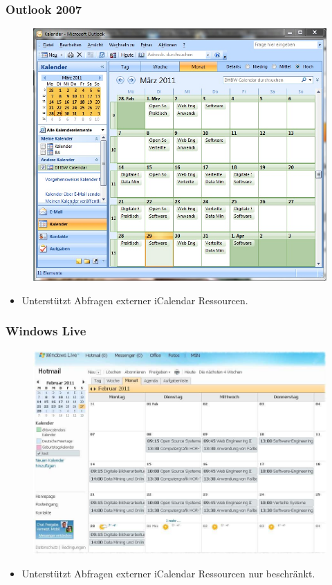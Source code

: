 \documentclass{beamer}
\begin{document}
\begin{frame}\frametitle{Outlook 2007}
  \begin{figure}
    \centering
    \includegraphics[height=0.6\paperheight]{images/dhbwcalendar-outlook2007.jpg}
  \end{figure}
  \begin{itemize}
    \item Unterstützt Abfragen externer iCalendar Ressourcen.
  \end{itemize}
\end{frame}

\begin{frame}\frametitle{Windows Live}
  \begin{figure}
    \centering
    \includegraphics[height=0.6\paperheight]{images/dhbwcalendar-live-web.jpg}
  \end{figure}
  \begin{itemize}
    \item Unterstützt Abfragen externer iCalendar Ressourcen nur beschränkt.
  \end{itemize}
\end{frame}
\end{document}
